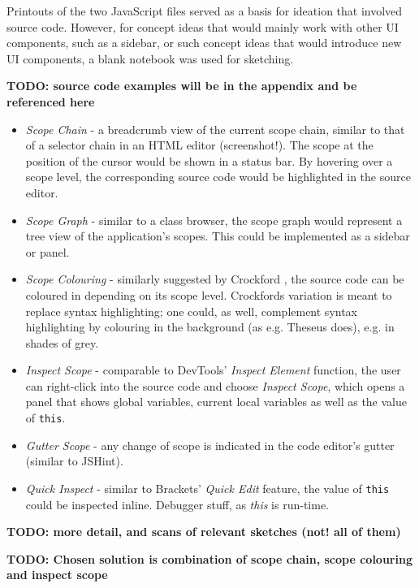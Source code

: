 Printouts of the two JavaScript files served as a basis for ideation
that involved source code. However, for concept ideas that would mainly
work with other UI components, such as a sidebar, or such concept ideas
that would introduce new UI components, a blank notebook was used for
sketching.

\textbf{TODO: source code examples will be in the appendix and be
referenced here}

\begin{itemize}
\itemsep1pt\parskip0pt
\item
  \emph{Scope Chain} - a breadcrumb view of the current scope chain,
  similar to that of a selector chain in an HTML editor (screenshot!).
  The scope at the position of the cursor would be shown in a status
  bar. By hovering over a scope level, the corresponding source code
  would be highlighted in the source editor.
\item
  \emph{Scope Graph} - similar to a class browser, the scope graph would
  represent a tree view of the application’s scopes. This could be
  implemented as a sidebar or panel.
\item
  \emph{Scope Colouring} - similarly suggested by Crockford
  \citeyear{crockford}, the source code can be coloured in depending on
  its scope level. Crockfords variation is meant to replace syntax
  highlighting; one could, as well, complement syntax highlighting by
  colouring in the background (as e.g. Theseus does), e.g. in shades of
  grey.
\item
  \emph{Inspect Scope} - comparable to DevTools’ \emph{Inspect Element}
  function, the user can right-click into the source code and choose
  \emph{Inspect Scope}, which opens a panel that shows global variables,
  current local variables as well as the value of \texttt{this}.
\item
  \emph{Gutter Scope} - any change of scope is indicated in the code
  editor’s gutter (similar to JSHint).
\item
  \emph{Quick Inspect} - similar to Brackets’ \emph{Quick Edit} feature,
  the value of \texttt{this} could be inspected inline. Debugger stuff,
  as \emph{this} is run-time.
\end{itemize}

\textbf{TODO: more detail, and scans of relevant sketches (not! all of
them)}

\textbf{TODO: Chosen solution is combination of scope chain, scope
colouring and inspect scope}
